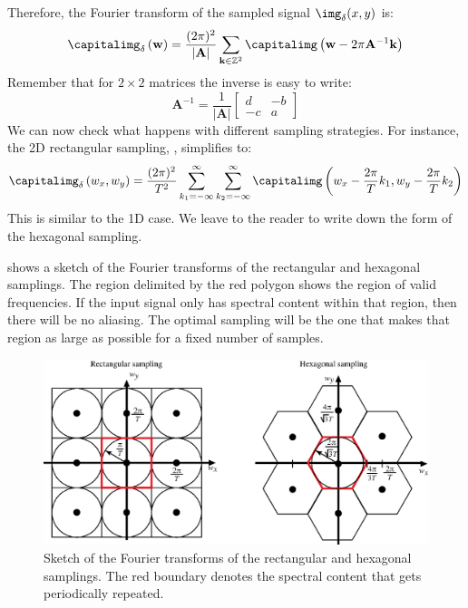 Therefore, the Fourier transform of the sampled signal $\img_{\delta} (x,y)$ is:
\begin{equation}
\capitalimg_{\delta} \left( \mathbf{w} \right) =  \frac{(2 \pi)^2}{|\mathbf{A}|} \sum_{\mathbf{k} \in \mathbb{Z}^2} \capitalimg \left( \mathbf{w} - 2 \pi \mathbf{A}^{-1} \mathbf{k} \right)
\label{eq:genericsampling}
\end{equation}
Remember that for $2\times2$ matrices the inverse is easy to write:
\begin{equation}
\mathbf{A}^{-1} = \frac{1}{|\mathbf{A}|} \left[ 
\begin{array}{cc}
d & -b\\
-c & a
\end{array}
\right]
\end{equation}
We can now check what happens with different sampling strategies. For instance, the 2D rectangular sampling, \eqn{\ref{eq:genericsampling}}, simplifies to:
\begin{equation}
 \capitalimg_{\delta} \left(w_x, w_y \right) =  \frac{(2 \pi)^2}{T^2} \sum_{k_1=-\infty}^{\infty} \sum_{k_2=-\infty}^{\infty} \capitalimg \left( w_x - \frac{2\pi}{T}k_1, w_y - \frac{2\pi}{T}k_2 \right)
\end{equation}
This is similar to the 1D case. We leave to the reader to write down the form of the hexagonal sampling. 



\Fig{\ref{fig:sampling_grids_FT}} shows a sketch of the Fourier transforms of the rectangular and hexagonal samplings. The region delimited by the red polygon shows the region of valid frequencies. If the input signal only has spectral content within that region, then there will be no aliasing. The optimal sampling will be the one that makes that region as large as possible for a fixed number of samples.



\begin{figure}[t]
\centerline{
\includegraphics[width=1\linewidth]{figures/Image_processing_sampling/sampling_grids_FT.eps}
}
\caption{Sketch of the Fourier transforms of the rectangular and hexagonal samplings. The red boundary denotes the spectral content that gets periodically repeated.}
\label{fig:sampling_grids_FT}
\end{figure}

